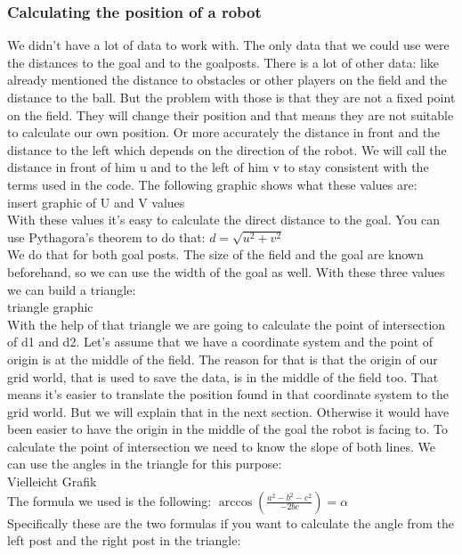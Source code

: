 \documentclass[lnicst,a4paper]{svmultln}
\begin{document}
\subsubsection{Calculating the position of a robot}
We didn't have a lot of data to work with. The only data that we could use were the distances to the goal and to the goalposts. There is a lot of other data: like already mentioned the distance to obstacles or other players on the field and the distance to the ball. But the problem with those is that they are not a fixed point on the field. They will change their position and that means they are not suitable to calculate our own position. Or more accurately the distance in front and the distance to the left which depends on the direction of the robot. We will call the distance in front of him u and to the left of him v to stay consistent with the terms used in the code. The following graphic shows what these values are:\\
insert graphic of U and V values\\
With these values it's easy to calculate the direct distance to the goal. You can use Pythagora's theorem to do that: \(d = \sqrt{u^2+v^2}\)\\
We do that for both goal posts. The size of the field and the goal are known beforehand, so we can use the width of the goal as well. With these three values we can build a triangle:\\
triangle graphic\\
With the help of that triangle we are going to calculate the point of intersection of d1 and d2. Let's assume that we have a coordinate system and the point of origin is at the middle of the field. The reason for that is that the origin of our grid world, that is used to save the data, is in the middle of the field too. That means it's easier to translate the position found in that coordinate system to the grid world. But we will explain that in the next section. Otherwise it would have been easier to have the origin in the middle of the goal the robot is facing to. To calculate the point of intersection we need to know the slope of both lines. We can use the angles in the triangle for this purpose:\\
Vielleicht Grafik\\
The formula we used is the following: \(\arccos{(\frac{a^2-b^2-c^2}{-2bc})} = \alpha\)\\ Specifically these are the two formulas if you want to calculate the angle from the left post and the right post in the triangle:\\ 
\end{document}

